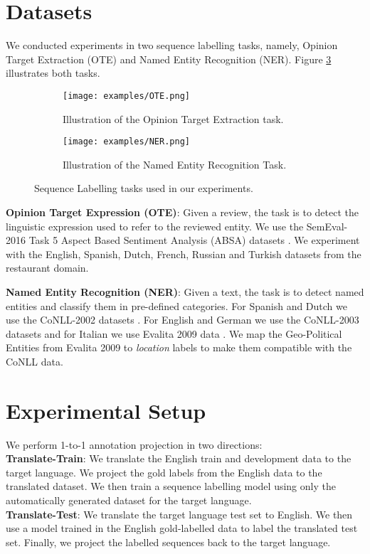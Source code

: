 \documentclass[11pt]{article}
\begin{document}
\section{Datasets}\label{sec:Datasets}

We conducted experiments in two sequence labelling tasks, namely, Opinion Target Extraction (OTE) and Named Entity Recognition (NER). Figure \ref{fig:Tasks} illustrates both tasks. 

\begin{figure}[tbp]
  \centering
  \begin{subfigure}[Figure A]{0.49\textwidth}
   \texttt{[image: examples/OTE.png]}
   \caption{Illustration of the Opinion Target Extraction task.}
    \label{char:Tasks.OTE}
  \end{subfigure}

   \begin{subfigure}[Figure B]{0.49\textwidth}
   \centering
        \texttt{[image: examples/NER.png]}
      \caption{Illustration of the Named Entity Recognition Task.}
      \label{char:Tasks.NER}
  \end{subfigure}
  \caption{Sequence Labelling tasks used in our experiments.}\label{fig:Tasks}
\end{figure}

\textbf{Opinion Target Expression (OTE)}: Given a review, the task is to detect the linguistic expression used to refer to the reviewed entity. We use the SemEval-2016 Task 5 Aspect Based Sentiment Analysis (ABSA) datasets \cite{pontiki-etal-2016-semeval}. We experiment with the English, Spanish, Dutch, French, Russian and Turkish datasets from the restaurant domain.

\textbf{Named Entity Recognition (NER)}: Given a text, the task is to detect named entities and classify them in pre-defined categories. For Spanish and Dutch we use the CoNLL-2002 datasets \cite{tjong-kim-sang-2002-introduction}. For English and German we use the CoNLL-2003 datasets \cite{tjong-kim-sang-de-meulder-2003-introduction} and for Italian we use Evalita 2009 data \cite{speranza2009named}. We map the Geo-Political Entities from Evalita 2009 to {\it location} labels to make them compatible with the CoNLL data.

\section{Experimental Setup}\label{sec:Setup}

We perform 1-to-1 annotation projection in two directions:\\
\textbf{Translate-Train}: We translate the English train and development data to the target language. We project the gold labels from the English data to the translated dataset. We then train a sequence labelling model using only the automatically generated dataset for the target language.\\
\textbf{Translate-Test}: We translate the target language test set to English. We then use a model trained in the English gold-labelled data to label the translated test set. Finally, we project the labelled sequences back to the target language.
\end{document}
